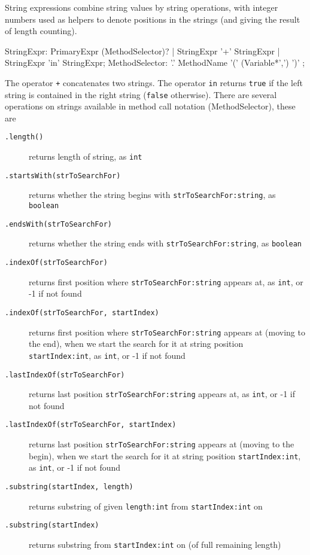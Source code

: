 String expressions combine string values by string operations, with integer numbers used as helpers to denote positions in the strings (and giving the result of length counting).

\begin{rail}
  StringExpr: PrimaryExpr (MethodSelector)? | StringExpr '+' StringExpr | StringExpr 'in' StringExpr;
  MethodSelector: '.' MethodName '(' (Variable*',') ')' ;
\end{rail}
The operator \texttt{+} concatenates two strings.
The operator \texttt{in} returns \texttt{true} if the left string is contained in the right string (\texttt{false} otherwise).
There are several operations on strings available in method call notation (MethodSelector), these are

\begin{description}
\item[\texttt{.length()}] returns length of string, as \texttt{int}
\item[\texttt{.startsWith(strToSearchFor)}] returns whether the string begins with \texttt{strToSearchFor:string}, as \texttt{boolean}
\item[\texttt{.endsWith(strToSearchFor)}] returns whether the string ends with \texttt{strToSearchFor:string}, as \texttt{boolean}
\item[\texttt{.indexOf(strToSearchFor)}] returns first position where \texttt{strToSearchFor:string} appears at, as \texttt{int}, or -1 if not found
\item[\texttt{.indexOf(strToSearchFor, startIndex)}] returns first position where \texttt{strToSearchFor:string} appears at (moving to the end), when we start the search for it at string position \texttt{startIndex:int}, as \texttt{int}, or -1 if not found
\item[\texttt{.lastIndexOf(strToSearchFor)}] returns last position \texttt{strToSearchFor:string} appears at, as \texttt{int}, or -1 if not found
\item[\texttt{.lastIndexOf(strToSearchFor, startIndex)}] returns last position \texttt{strToSearchFor:string} appears at (moving to the begin), when we start the search for it at string position \texttt{startIndex:int}, as \texttt{int}, or -1 if not found
\item[\texttt{.substring(startIndex, length)}] returns substring of given \texttt{length:int} from \texttt{startIndex:int} on
\item[\texttt{.substring(startIndex)}] returns substring from \texttt{startIndex:int} on (of full remaining length)

\end{description}
